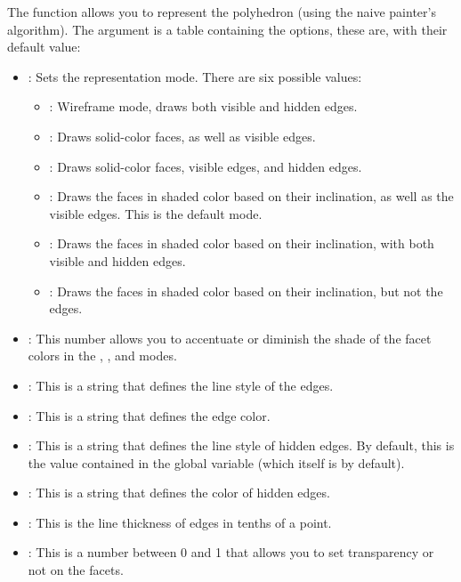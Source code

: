 The function  allows you to represent the polyhedron  (using the naive painter's algorithm). The argument  is a table containing the options, these are, with their default value:
\begin{itemize}
    \item {}: Sets the representation mode. There are six possible values:
\begin{itemize}
    \item {}: Wireframe mode, draws both visible and hidden edges.
    \item {}: Draws solid-color faces, as well as visible edges.
    \item {}: Draws solid-color faces, visible edges, and hidden edges.
    \item {}: Draws the faces in shaded color based on their inclination, as well as the visible edges. This is the default mode.
    \item {}: Draws the faces in shaded color based on their inclination, with both visible and hidden edges.
    \item {}: Draws the faces in shaded color based on their inclination, but not the edges.
\end{itemize}
    \item {}: This number allows you to accentuate or diminish the shade of the facet colors in the , , and  modes.
    \item {}: This is a string that defines the line style of the edges.
    \item {}: This is a string that defines the edge color.
    \item {}: This is a string that defines the line style of hidden edges. By default, this is the value contained in the global variable  (which itself is  by default).
    \item {}: This is a string that defines the color of hidden edges.
    \item {}: This is the line thickness of edges in tenths of a point.
    \item {} : This is a number between 0 and 1 that allows you to set transparency or not on the facets.

\end{itemize}
